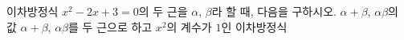 이차방정식 $x^2-2x+3=0$의 두 근을 $\alpha$, $\beta$라 할 때, 다음을 구하시오.
 $\alpha+\beta$, $\alpha\beta$의 값
 $\alpha+\beta$, $\alpha\beta$를 두 근으로 하고 $x^2$의 계수가 $1$인 이차방정식

